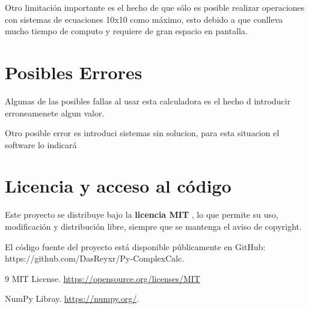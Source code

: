 \documentclass[twoside,a4paper]{refart}
\begin{document}
Otro limitación importante es el hecho de que sólo es posible realizar operaciones con sistemas de ecuaciones 10x10 como máximo, esto debido a que conlleva mucho tiempo de computo y requiere de gran espacio en pantalla.

\section{Posibles Errores}
Algunas de las posibles fallas al usar esta calculadora es el hecho d introducir erroneamenete algun valor.

Otro posible error es introduci sistemas sin solucion, para esta situacion el software lo indicará
\section{Licencia y acceso al código}

Este proyecto se distribuye bajo la \textbf{licencia MIT} \cite{mit_license}, lo que permite su uso, modificación y distribución libre, siempre que se mantenga el aviso de copyright.

El código fuente del proyecto está disponible públicamente en GitHub: 
https://github.com/DasReyxr/Py-ComplexCalc.

\begin{thebibliography}{9}
MIT License. \url{https://opensource.org/licenses/MIT}

NumPy Libray. \url{https://numpy.org/}.

\end{thebibliography}


\end{document}
